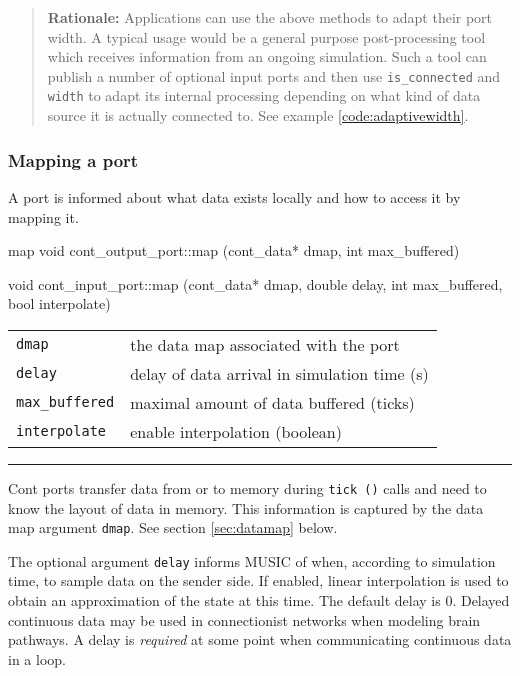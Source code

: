 \documentclass[a4paper]{report}
\makeatletter
\newenvironment{rationale}%
{\par\begin{quote}\textbf{Rationale:}}%
{\par\end{quote}}
\newenvironment{parameters}%
{\begin{tabular}{@{\hspace{2em}}lp{0.6\textwidth}}}%
{\end{tabular}\par\vspace{1mm}\par\hrule\par\vspace{5mm}}
\makeatother
\begin{document}
\begin{rationale}
  Applications can use the above methods to adapt their port width.  A
  typical usage would be a general purpose post-processing tool which
  receives information from an ongoing simulation.  Such a tool can
  publish a number of optional input ports and then use
  \lstinline|is_connected| and \lstinline|width| to adapt its internal
  processing depending on what kind of data source it is actually
  connected to.  See example \ref{code:adaptivewidth}.
\end{rationale}


\subsubsection{Mapping a port}

A port is informed about what data exists locally and how to access it
by mapping it.

\begin{head}{map}
  void cont_output_port::map (cont_data* dmap, int max_buffered)

  void cont_input_port::map (cont_data* dmap,
                             double delay,
                             int max_buffered,
                             bool interpolate)
\end{head}
\begin{parameters}
  \lstinline|dmap| & the data map associated with the port \\
  \lstinline|delay| & delay of data arrival in simulation time (s) \\
  \lstinline|max_buffered| & maximal amount of data buffered (ticks)
  \\
  \lstinline|interpolate| & enable interpolation (boolean) \\
\end{parameters}

Cont ports transfer data from or to memory during \lstinline|tick ()|
calls and need to know the layout of data in memory.  This information
is captured by the data map argument \lstinline|dmap|. See section
\ref{sec:datamap} below.

The optional argument \lstinline|delay| informs MUSIC of when,
according to simulation time, to sample data on the sender side.  If
enabled, linear interpolation is used to obtain an approximation of
the state at this time.  The default delay is 0.  Delayed continuous
data may be used in connectionist networks when modeling brain
pathways.  A delay is \emph{required} at some point when communicating
continuous data in a loop.
\end{document}

